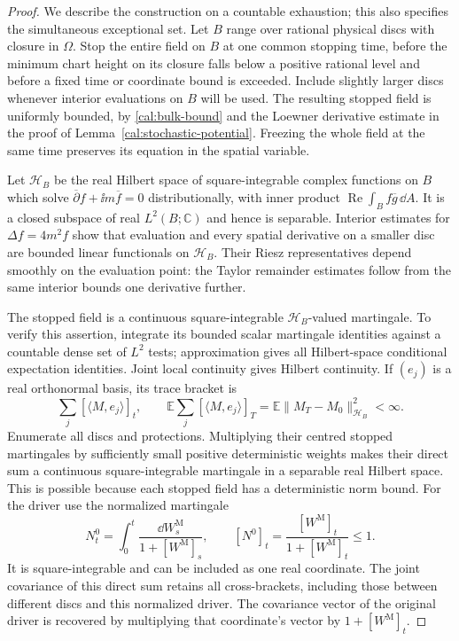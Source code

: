 \begin{proof}
We describe the construction on a countable exhaustion; this also
specifies the simultaneous exceptional set.  Let $B$ range over
rational physical discs with closure in $\Omega$.  Stop the entire
field on $B$ at one common stopping time, before the minimum chart
height on its closure falls below a positive rational level and before
a fixed time or coordinate bound is exceeded.  Include slightly larger
discs whenever interior evaluations on $B$ will be used.  The resulting
stopped field is uniformly bounded, by
\eqref{cal:bulk-bound} and the Loewner derivative estimate in the proof
of Lemma~\ref{cal:stochastic-potential}.  Freezing the whole field at
the same time preserves its equation in the spatial variable.

Let $\mathcal H_B$ be the real Hilbert space of square-integrable
complex functions on $B$ which solve
$\overline\partial f+\ii m\overline f=0$ distributionally, with inner
product $\operatorname{Re}\int_B f\overline g\,\dd A$.
It is a closed subspace of real $L^2(B;\mathbb C)$ and hence is
separable.  Interior estimates for $\Delta f=4m^2f$ show that evaluation
and every spatial derivative on a smaller disc are bounded linear
functionals on $\mathcal H_B$.  Their Riesz representatives depend
smoothly on the evaluation point: the Taylor remainder estimates
follow from the same interior bounds one derivative further.

The stopped field is a continuous square-integrable
$\mathcal H_B$-valued martingale.  To verify this assertion, integrate
its bounded scalar martingale identities against a countable dense set
of $L^2$ tests; approximation gives all Hilbert-space conditional
expectation identities.  Joint local continuity gives Hilbert
continuity.  If $(e_j)$ is a real orthonormal basis, its trace bracket is
\[
 \sum_j[\langle M,e_j\rangle]_t,
 \qquad
 \mathbb E\sum_j[\langle M,e_j\rangle]_T
   =\mathbb E\|M_T-M_0\|_{\mathcal H_B}^2<\infty.
\]
Enumerate all discs and protections.  Multiplying their centred
stopped martingales by sufficiently small positive deterministic
weights makes their direct sum a continuous square-integrable
martingale in a separable real Hilbert space.  This is possible because
each stopped field has a deterministic norm bound.  For the driver use the normalized martingale
\[
 N_t^0=\int_0^t\frac{\dd W_s^{\mathrm M}}{1+[W^{\mathrm M}]_s},
 \qquad [N^0]_t=\frac{[W^{\mathrm M}]_t}{1+[W^{\mathrm M}]_t}\leq1.
\]
It is square-integrable and can be included as one real coordinate.
The joint covariance of this direct sum retains all cross-brackets,
including those between different discs and this normalized driver.
The covariance vector of the original driver is recovered by
multiplying that coordinate's vector by $1+[W^{\mathrm M}]_t$.


\end{proof}
